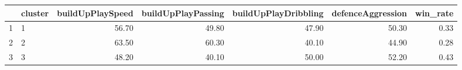 \begin{table}[ht]
\centering
\begin{tabular}{rlrrrrr}
  \hline
 & cluster & buildUpPlaySpeed & buildUpPlayPassing & buildUpPlayDribbling & defenceAggression & win\_rate \\ 
  \hline
1 & 1 & 56.70 & 49.80 & 47.90 & 50.30 & 0.33 \\ 
  2 & 2 & 63.50 & 60.30 & 40.10 & 44.90 & 0.28 \\ 
  3 & 3 & 48.20 & 40.10 & 50.00 & 52.20 & 0.43 \\ 
   \hline
\end{tabular}
\end{table}
